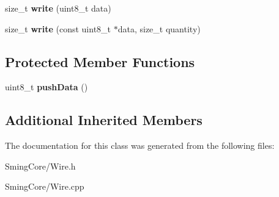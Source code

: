 \begin{DoxyCompactItemize}
\item 
\hypertarget{class_two_wire_a2b5f9f156b6d281746a2a6ca5707dad3}{}size\+\_\+t {\bfseries write} (uint8\+\_\+t data)\label{class_two_wire_a2b5f9f156b6d281746a2a6ca5707dad3}

\item 
\hypertarget{class_two_wire_a362e77085e50bed9c881861469378aa2}{}size\+\_\+t {\bfseries write} (const uint8\+\_\+t $\ast$data, size\+\_\+t quantity)\label{class_two_wire_a362e77085e50bed9c881861469378aa2}

\end{DoxyCompactItemize}
\subsection*{Protected Member Functions}
\begin{DoxyCompactItemize}
\item 
\hypertarget{class_two_wire_aef3231213badb76da9eb9cc449f761e2}{}uint8\+\_\+t {\bfseries push\+Data} ()\label{class_two_wire_aef3231213badb76da9eb9cc449f761e2}

\end{DoxyCompactItemize}
\subsection*{Additional Inherited Members}


The documentation for this class was generated from the following files\+:\begin{DoxyCompactItemize}
\item 
Sming\+Core/Wire.\+h\item 
Sming\+Core/Wire.\+cpp\end{DoxyCompactItemize}
